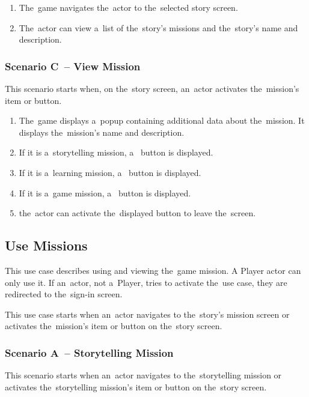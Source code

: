 \begin{enumerate}
    \item The~game navigates the~actor to the~selected story screen.
    \item The~actor can view a~list of the~story's missions and the~story's name and description.
\end{enumerate}

\subsubsection*{Scenario C~-- View Mission}

This scenario starts when, on the~story screen, an~actor activates the~mission's item or button.

\begin{enumerate}
    \item The~game displays a~popup containing additional data about the~mission.
    It displays the~mission's name and description.
    \item If it is a~storytelling mission, a~ button is displayed.
    \item If it is a~learning mission, a~ button is displayed.
    \item If it is a~game mission, a~ button is displayed.
    \item the~actor can activate the~displayed button to leave the~screen.
\end{enumerate}

\pagebreak
\subsection{Use Missions}

This use case describes using and viewing the~game mission.
A Player actor can only use it.
If an~actor, not a~Player, tries to activate the~use case, they are redirected to the~sign-in screen.

This use case starts when an~actor navigates to the~story's mission screen or activates the~mission's item or button on the~story screen.

\subsubsection*{Scenario A~-- Storytelling Mission}

This scenario starts when an~actor navigates to the~storytelling mission or activates the~storytelling mission's item or button on the~story screen.

